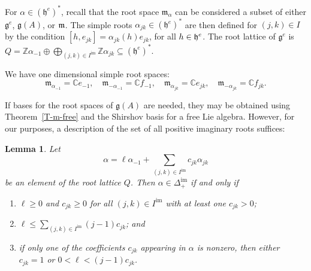 \documentclass[11pt,letterpaper]{amsart}
\newcounter{thecounter}
\numberwithin{thecounter}{section}
\newtheorem{lemma}[thecounter]{Lemma}
\theoremstyle{definition}
\DeclareMathOperator{\im}{{im}}
\renewcommand{\a}{\alpha}
\newcommand{\Z}{{\mathbb Z}}
\newcommand{\C}{{\mathbb C}}
\begin{document}
For $\a\in\left(\mathfrak{h}^e \right)^*$,  recall that the root space $\mathfrak{m}_{\a}$ can be considered a subset of either $\mathfrak{g}^e$,  $\mathfrak{g}(A)$, or $\frak m$. 
The simple roots ${\alpha}_{jk} \in (\mathfrak{h}^e)^*$ are then defined for $(j,k) \in I$ by the condition
$[h,e_{jk}]=\alpha_{jk}(h)e_{jk}$, for all $h \in \frak h^e$.
The root lattice of $\mathfrak{g}^e$  is 
$ Q = \Z\a_{-1} \oplus \bigoplus_{(j,k)\in I^{\im} } \Z \a_{jk}\subseteq \left(\mathfrak{h}^e \right)^*$.

We have  one dimensional simple root spaces:
$${\mathfrak m}_{\a_{-1}} = \C {e}_{-1},\quad {\mathfrak m}_{-\a_{-1}} = \C {f}_{-1},\quad {\mathfrak m}_{\a_{jk}} =\C {e}_{jk},\quad {\mathfrak m}_{-\a_{jk}} =\C {f}_{jk}.$$



    
If bases for  the root spaces of $\mathfrak{g}(A)$ are needed, they may be obtained using Theorem~\ref{T-m-free} and the Shirshov basis \cite{shirshov2009bases} for a free Lie algebra. However, for our purposes, 
a description of the set of all positive imaginary roots suffices:
\begin{lemma}\label{L-rts}  Let $$\alpha=\ell\a_{-1} + \sum_{(j,k)\in I^{\im}} c_{jk} \a_{jk}$$ be an element of the root lattice $Q$.
Then $\alpha\in{\Delta}^{\im}_+$ if and only if 
\begin{enumerate}
\item\label{Delta-pos} $\ell\ge0$ and $c_{jk}\ge0$ for all $(j,k)\in I^{\im}$ with at least one $c_{jk}>0$; 
\item\label{Delta-ell} $\displaystyle \ell \le \sum_{(j,k)\in I^{\im}} (j-1)c_{jk}$; and 
\item\label{Delta-norepeat}   if only one of the coefficients $c_{jk}$ appearing in $\alpha$ is nonzero, then either $c_{jk}=1$ or $ 0<\ell<(j-1)c_{jk}$.
\end{enumerate}
\end{lemma}
\end{document}
